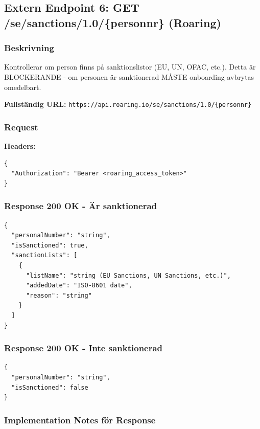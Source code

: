 \documentclass[12pt,a4paper]{article}
\begin{document}
\subsection{Extern Endpoint 6: GET /se/sanctions/1.0/\{personnr\} (Roaring)}

\subsubsection{Beskrivning}

Kontrollerar om person finns på sanktionslistor (EU, UN, OFAC, etc.). Detta är BLOCKERANDE - om personen är sanktionerad MÅSTE onboarding avbrytas omedelbart.

\textbf{Fullständig URL:} \texttt{https://api.roaring.io/se/sanctions/1.0/\{personnr\}}

\subsubsection{Request}

\textbf{Headers:}
\begin{lstlisting}
{
  "Authorization": "Bearer <roaring_access_token>"
}
\end{lstlisting}

\subsubsection{Response 200 OK - Är sanktionerad}

\begin{lstlisting}
{
  "personalNumber": "string",
  "isSanctioned": true,
  "sanctionLists": [
    {
      "listName": "string (EU Sanctions, UN Sanctions, etc.)",
      "addedDate": "ISO-8601 date",
      "reason": "string"
    }
  ]
}
\end{lstlisting}

\subsubsection{Response 200 OK - Inte sanktionerad}
\begin{lstlisting}
{
  "personalNumber": "string",
  "isSanctioned": false
}
\end{lstlisting}

\subsubsection{Implementation Notes för Response}
\end{document}
